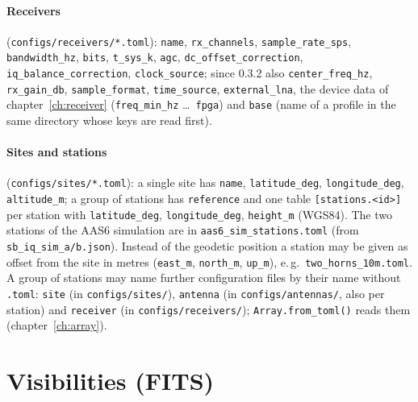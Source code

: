 \paragraph*{Receivers} (\texttt{configs/receivers/*.toml}):
\texttt{name}, \texttt{rx\_channels}, \texttt{sample\_rate\_sps},
\texttt{bandwidth\_hz}, \texttt{bits}, \texttt{t\_sys\_k}, \texttt{agc},
\texttt{dc\_offset\_correction}, \texttt{iq\_balance\_correction},
\texttt{clock\_source}; since 0.3.2 also \texttt{center\_freq\_hz},
\texttt{rx\_gain\_db}, \texttt{sample\_format}, \texttt{time\_source},
\texttt{external\_lna}, the device data of chapter~\ref{ch:receiver}
(\texttt{freq\_min\_hz} \dots\ \texttt{fpga}) and \texttt{base} (name of a
profile in the same directory whose keys are read first).

\paragraph*{Sites and stations} (\texttt{configs/sites/*.toml}): a single
site has \texttt{name}, \texttt{latitude\_deg}, \texttt{longitude\_deg},
\texttt{altitude\_m}; a group of stations has \texttt{reference} and one
table \texttt{[stations.<id>]} per station with \texttt{latitude\_deg},
\texttt{longitude\_deg}, \texttt{height\_m} (WGS84). The two stations of
the AAS6 simulation are in \texttt{aas6\_sim\_stations.toml}
(from \texttt{sb\_iq\_sim\_a/b.json}).
Instead of the geodetic position a station may be given as offset from
the site in metres (\texttt{east\_m}, \texttt{north\_m}, \texttt{up\_m}),
e.\,g.\ \texttt{two\_horns\_10m.toml}. A group of stations may name
further configuration files by their name without \texttt{.toml}:
\texttt{site} (in \texttt{configs/sites/}), \texttt{antenna} (in
\texttt{configs/antennas/}, also per station) and \texttt{receiver} (in
\texttt{configs/receivers/}); \texttt{Array.from\_toml()} reads them
(chapter~\ref{ch:array}).

\section{Visibilities (FITS)}

